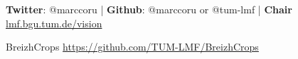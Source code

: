 \documentclass[%
  aspectratio=169,
  9pt,
  USenglish,
  titlegraphic, %
  affiliationintitlepagehead,
  affiliation,
]{beamer}
\begin{document}
{
	\begin{frame}[plain]
	\vfill
	\begin{center}
		\Huge\color{tumwhite}
%		
	\end{center}


\vspace{1em}	
\color{tumbluelight}
\textbf{Twitter}: @marccoru | \textbf{Github}: @marccoru or @tum-lmf | \textbf{Chair} \url{lmf.bgu.tum.de/vision} \\ 

\vspace{1em}

\Large
BreizhCrops \url{https://github.com/TUM-LMF/BreizhCrops}
	
\vfill
\end{frame}
}
\end{document}

